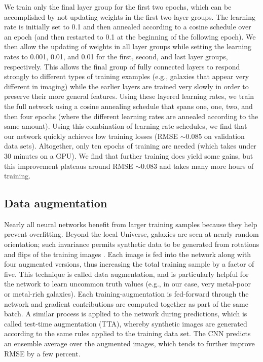 \documentclass[fleqn,usenatbib]{mnras}
\begin{document}
We train only the final layer group for the first two epochs, which can be accomplished by not updating weights in the first two layer groups.
The learning rate is initially set to 0.1 and then annealed according to a cosine schedule over an epoch (and then restarted to 0.1 at the beginning of the following epoch).
We then allow the updating of weights in all layer groups while setting the learning rates to 0.001, 0.01, and 0.01 for the first, second, and last layer groups, respectively.
This allows the final group of fully connected layers to respond strongly to different types of training examples (e.g., galaxies that appear very different in \sdssi\sdssr\sdssg{} imaging) while the earlier layers are trained very slowly in order to preserve their more general features.
Using these layered learning rates, we train the full network using a cosine annealing schedule that spans one, one, two, and then four epochs (where the different learning rates are annealed according to the same amount).
Using this combination of learning rate schedules, we find that our network quickly achieves low training losses (RMSE $\sim 0.085$ on validation data sets).
Altogether, only ten epochs of training are needed (which takes under 30 minutes on a GPU).
We find that further training does yield some gains, but this improvement plateaus around RMSE $\sim 0.083$ and takes many more hours of training.


\subsection{Data augmentation}\label{sec:data aug}
Nearly all neural networks benefit from larger training samples because they help prevent overfitting.
Beyond the local Universe, galaxies are seen at nearly random orientation; such invariance permits synthetic data to be generated from rotations and flips of the training images \citep[see, e.g.,][]{2014arXiv1409.1556S}.
Each image is fed into the network along with four augmented versions, thus increasing the total training sample by a factor of five.
This technique is called data augmentation, and is particularly helpful for the network to learn uncommon truth values (e.g., in our case, very metal-poor or metal-rich galaxies).
Each training-augmentation is fed-forward through the network and gradient contributions are computed together as part of the same batch.
A similar process is applied to the network during predictions, which is called test-time augmentation (TTA), whereby synthetic images are generated according to the same rules applied to the training data set.
The CNN predicts an ensemble average over the augmented images, which tends to further improve RMSE by a few percent.


\bsp	%
\label{lastpage}
\end{document}
